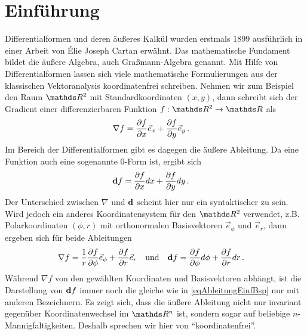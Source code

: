 \setcounter{chapter}{-1}
\setcounter{page}{1} 
\chapter{Einführung}

Differentialformen und deren äußeres Kalkül wurden erstmals 1899 ausführlich in einer Arbeit von \'{E}lie Joseph Cartan \cite{cartan} erwähnt.
Das mathematische Fundament bildet die äußere Algebra, auch Graßmann-Algebra genannt.
Mit Hilfe von Differentialformen lassen sich viele mathematische Formulierungen aus der klassischen Vektoranalysis koordinatenfrei schreiben.
Nehmen wir zum Beispiel den Raum \( \R^{2} \) mit Standardkoordinaten \( (x,y) \), dann schreibt sich der Gradient einer differenzierbaren Funktion 
\( f:\R^{2}\rightarrow \R \) als
\begin{align}
  \nabla f &= \frac{\partial f}{\partial x} \vec{e}_{x} + \frac{\partial f}{\partial y} \vec{e}_{y} \,\text{.}
\end{align}
Im Bereich der Differentialformen gibt es dagegen die äußere Ableitung.
Da eine Funktion auch eine sogenannte 0-Form ist, ergibt sich
\begin{align}
  \label{eqAbleitungEinfBsp}
  \mathbf{d} f &= \frac{\partial f}{\partial x} dx + \frac{\partial f}{\partial y} dy \,\text{.}
\end{align}
Der Unterschied zwischen \( \nabla \) und \( \mathbf{d} \) scheint hier nur ein syntaktischer zu sein.
Wird jedoch ein anderes Koordinatensystem für den \( \R^{2} \) verwendet, z.B. Polarkoordinaten \((\phi , r)\) mit orthonormalen Basisvektoren 
\(  \vec{e}_{\phi} \) und \( \vec{e}_{r} \),
dann ergeben sich für beide Ableitungen
\begin{align}
  \nabla f &= \frac{1}{r}\frac{\partial f}{\partial \phi} \vec{e}_{\phi} + \frac{\partial f}{\partial r} \vec{e}_{r} \quad\text{und}\quad 
  \mathbf{d} f = \frac{\partial f}{\partial \phi} d\phi + \frac{\partial f}{\partial r} dr \,\text{.}
\end{align}
Während \( \nabla f \) von den gewählten Koordinaten und Basisvektoren abhängt, ist die Darstellung von \( \mathbf{d} f \) immer noch die gleiche wie in 
\eqref{eqAbleitungEinfBsp} nur mit anderen Bezeichnern.
Es zeigt sich, dass die äußere Ableitung nicht nur invariant gegenüber Koordinatenwechsel im \( \R^{n} \) ist, sondern sogar auf beliebige \( n \)-Mannigfaltigkeiten.
Deshalb sprechen wir hier von "`koordinatenfrei"'.

